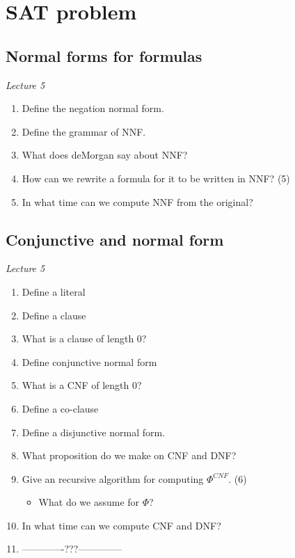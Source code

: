 \documentclass[fleqn]{article}
\begin{document}
\section{SAT problem}

\subsection{Normal forms for formulas}
\textit{Lecture 5}
\begin{enumerate}
    \item Define the negation normal form.
    \item Define the grammar of NNF.
    \item What does deMorgan say about NNF?
    \item How can we rewrite a formula for it to be written in NNF? (5) 
    \item In what time can we compute NNF from the original?
\end{enumerate}

\subsection{Conjunctive and  normal form}
\textit{Lecture 5}
\begin{enumerate}
    \item Define a literal
    \item Define a clause
    \item What is a clause of length 0?
    \item Define conjunctive normal form
    \item What is a CNF of length 0?
    \item Define a co-clause
    \item Define a disjunctive normal form.
    \item What proposition do we make on CNF and DNF?
    \item Give an recursive algorithm for computing $\Phi^{CNF}$. (6)
    \begin{itemize}
        \item What do we assume for $\Phi$?
    \end{itemize}
    \item In what time can we compute CNF and DNF?
    \item -------------???-------------- 
\end{enumerate}
\end{document}
